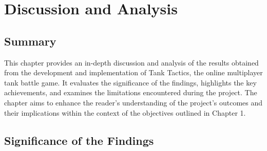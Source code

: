\chapter{Discussion and Analysis}
\label{ch:evaluation}


\section{Summary}
This chapter provides an in-depth discussion and analysis of the results obtained from the development and implementation of Tank Tactics, the online multiplayer tank battle game. It evaluates the significance of the findings, highlights the key achievements, and examines the limitations encountered during the project. The chapter aims to enhance the reader's understanding of the project's outcomes and their implications within the context of the objectives outlined in Chapter 1.

\section{Significance of the Findings}